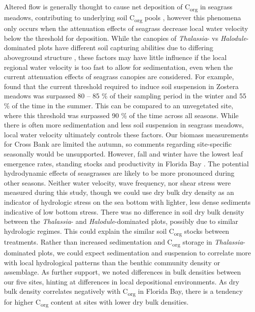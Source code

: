 Altered flow is generally thought to cause net deposition of C\textsubscript{org} in seagrass meadows, contributing to underlying soil C\textsubscript{org} pools \citep{Kennedy:2010if, Fourqurean:2012cv}, however this phenomena only occurs when the attenuation effects of seagrass decrease local water velocity below the threshold for deposition. While the canopies of \textit{Thalassia}- vs \textit{Halodule}- dominated plots have different soil capturing abilities due to differing aboveground structure \citep{Mellors:2002vi, Boer:2007ch}, these factors may have little influence if the local regional water velocity is too fast to allow for sedimentation, even when the current attenuation effects of seagrass canopies are considered. For example, \citet{Hansen:2013fn} found that the current threshold required to induce soil suspension in Zostera meadows was surpassed 80 – 85 \% of their sampling period in the winter and 55 \% of the time in the summer. This can be compared to an unvegetated site, where this threshold was surpassed 90 \% of the time across all seasons. While there is often more sedimentation and less soil suspension in seagrass meadows, local water velocity ultimately controls these factors. Our biomass measurements for Cross Bank are limited the autumn, so comments regarding site-specific seasonally would be unsupported. However, fall and winter have the lowest leaf emergence rates, standing stocks and productivity in Florida Bay \citep{Zieman:1999uj, Peterson:2001wu}. The potential hydrodynamic effects of seasgrasses are likely to be more pronounced during other seasons. Neither water velocity, wave frequency, nor shear stress were measured during this study, though we could use dry bulk dry density as an indicator of hydrologic stress on the sea bottom with lighter, less dense sediments indicative of low bottom stress. There was no difference in soil dry bulk density between the \textit{Thalassia}- and \textit{Halodule}-dominated plots, possibly due to similar hydrologic regimes. This could explain the similar soil C\textsubscript{org} stocks between treatments. Rather than increased sedimentation and C\textsubscript{org} storage in \textit{Thalassia}-dominated plots, we could expect sedimentation and suspension to correlate more with local hydrological patterns than the benthic community density or assemblage. As further support, we noted differences in bulk densities between our five sites, hinting at differences in local depositional environments. As dry bulk density correlates negatively with C\textsubscript{org} in Florida Bay, there is a tendency for higher C\textsubscript{org} content at sites with lower dry bulk densities.

